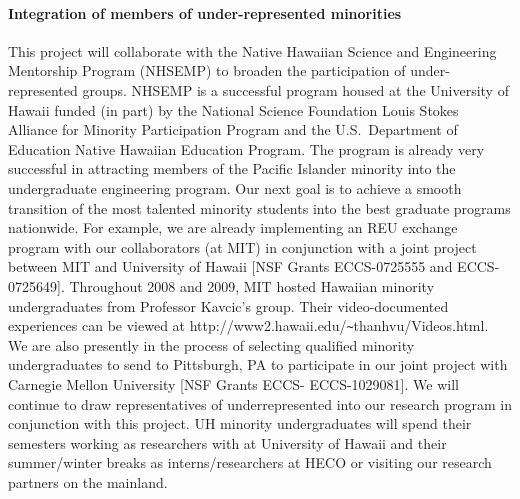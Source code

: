 \paragraph{Integration of members of under-represented minorities}

This project will collaborate with the Native Hawaiian Science and
Engineering Mentorship Program (NHSEMP) to broaden the participation of
under-represented groups. NHSEMP is a successful program housed at the
University of Hawaii funded (in part) by the National Science Foundation
Louis Stokes Alliance for Minority Participation Program and the
U.S.~Department of Education Native Hawaiian Education Program. The program
is already very successful in attracting members of the Pacific Islander
minority into the undergraduate engineering program. Our next goal is to
achieve a smooth transition of the most talented minority students into the
best graduate programs nationwide. For example, we are already implementing
an REU exchange program with our collaborators (at MIT) in conjunction with
a joint project between MIT and University of Hawaii [NSF Grants
ECCS-0725555 and ECCS-0725649]. Throughout 2008 and 2009, MIT hosted
Hawaiian minority undergraduates from Professor Kavcic's group. Their
video-documented experiences can be viewed at 
  http://www2.hawaii.edu/\verb+~+thanhvu/Videos.html. We are also
presently in the process of selecting qualified minority undergraduates to
send to Pittsburgh, PA to participate in our joint project with Carnegie
Mellon University [NSF Grants ECCS- ECCS-1029081]. We will continue to draw
representatives of underrepresented into our research program in
conjunction with this project. UH minority undergraduates will spend their
semesters working as researchers with at University of Hawaii and their
summer/winter breaks as interns/researchers at HECO or visiting our
research partners on the mainland.
